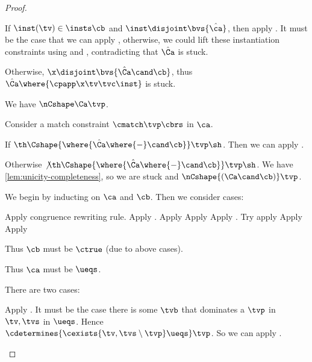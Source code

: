 \documentclass[acmsmall,screen,nonacm%
\Anonymous{,anonymous}{}%
\Final{}{,review}%
]{acmart}
\begin{document}
\begin{proof}
\begin{proofcases}
\begin{proofcases}
\begin{proofcases}
      If $\inst(\tv) \in \insts \cb$ and $\inst \disjoint \bvs {\hat\ca}$, then apply .
	    It must be the case that we can apply , otherwise, we could lift these instantiation
	    constraints using  and , contradicting that $\hat\Ca$ is stuck.

	    Otherwise, $\x \disjoint \bvs {\hat \Ca \cand \cb}$, thus $\hat\Ca\where{\cpapp \x \tv \tvc \inst}$ is stuck.

	  \proofcase{$\hat\Ca\where{\cmatch \tvp \cbrs}$}
	    We have $\nCshape \Ca \tvp$.

	    Consider a match constraint $\cmatch \tvp \cbrs$ in $\ca$.

      If $\th \Cshape {\where{\hat\Ca\where{-} \cand \cb}} \tvp \sh$. Then we can apply .

      Otherwise $\not \th \Cshape {\where{\hat\Ca\where{-} \cand \cb}} \tvp \sh$. We have \cref{lem:unicity-completeness},
      so we are stuck and $\nCshape {(\Ca \cand \cb)} \tvp$.
	\end{proofcases}

    \end{proofcases}

    \proofcase{$\cletr \x \tv \tvs \ca \cb$}
    We begin by inducting on $\ca$ and $\cb$. Then we consider cases:
    \begin{proofcases}
       Apply congruence rewriting rule.
       Apply .
       Apply 
       Apply 
       Apply .
       Try apply 
       Apply 
       Apply 

	Thus $\cb$ must be $\ctrue$ (due to above cases).
	\begin{proofcases}
	    Thus $\ca$ must be $\ueqs$.

	    There are two cases:
	    \begin{itemize}
	      \proofcase{$\cexists {\tv, \tvs} \ueqs \cequiv \ctrue$} Apply .
	      \proofcase{$\cexists {\tv, \tvs} \ueqs \cnequiv \ctrue$} It must be the case there is some $\tvb$ that dominates a $\tvp$ in $\tv, \tvs$ in $\ueqs$.
		Hence $\cdetermines {\cexists {\tv, \tvs \setminus \tvp} \ueqs} \tvp$.
		So we can apply .
	    \end{itemize}


\end{proofcases}
\end{proofcases}
\end{proofcases}
\end{proof}
\end{document}
